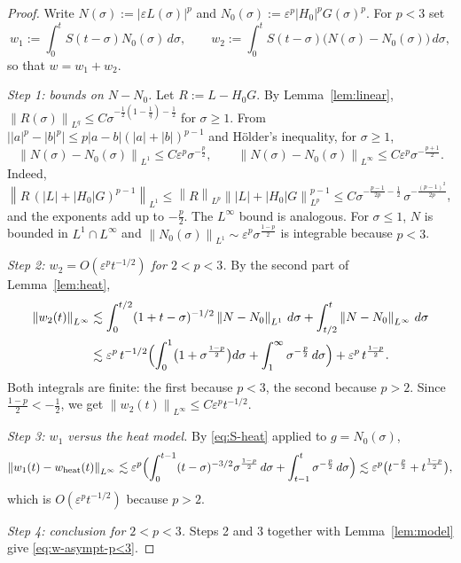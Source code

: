 \documentclass[11pt]{amsart}
\theoremstyle{definition}
\theoremstyle{remark}
\numberwithin{equation}{section}
\newcommand{\ep}{\varepsilon}
\newcommand{\norm}[1]{\left\lVert #1\right\rVert}
\begin{document}
\begin{proof}
Write $N(\sigma):=|\ep L(\sigma)|^p$ and $N_0(\sigma):=\ep^p|H_0|^pG(\sigma)^p$.
For $p<3$ set
\[
w_1:=\int_0^tS(t-\sigma)N_0(\sigma)\,d\sigma,\qquad
w_2:=\int_0^tS(t-\sigma)\bigl(N(\sigma)-N_0(\sigma)\bigr)\,d\sigma ,
\]
so that $w=w_1+w_2$.

\medskip
\noindent\emph{Step 1: bounds on $N-N_0$.}
Let $R:=L-H_0G$. By Lemma~\ref{lem:linear}, $\norm{R(\sigma)}_{L^q}\le
C\sigma^{-\frac12(1-\frac1q)-\frac12}$ for $\sigma\ge1$.
From $\bigl||a|^p-|b|^p\bigr|\le p|a-b|(|a|+|b|)^{p-1}$ and H\"older's
inequality, for $\sigma\ge1$,
\begin{equation}\label{eq:N-diff}
\norm{N(\sigma)-N_0(\sigma)}_{L^1}\le C\ep^p\sigma^{-\frac p2},
\qquad
\norm{N(\sigma)-N_0(\sigma)}_{L^\infty}\le C\ep^p\sigma^{-\frac{p+1}{2}} .
\end{equation}
Indeed,
$\norm{R\,(|L|+|H_0|G)^{p-1}}_{L^1}\le\norm{R}_{L^p}\norm{|L|+|H_0|G}_{L^p}^{p-1}
\le C\sigma^{-\frac{p-1}{2p}-\frac12}\,\sigma^{-\frac{(p-1)^2}{2p}}$,
and the exponents add up to $-\frac p2$. The $L^\infty$ bound is analogous.
For $\sigma\le1$, $N$ is bounded in $L^1\cap L^\infty$ and
$\norm{N_0(\sigma)}_{L^1}\sim\ep^p\sigma^{\frac{1-p}{2}}$ is integrable
because $p<3$.

\medskip
\noindent\emph{Step 2: $w_2=O(\ep^pt^{-1/2})$ for $2<p<3$.}
By the second part of Lemma~\ref{lem:heat},
\begin{align*}
\norm{w_2(t)}_{L^\infty}
&\lesssim \int_0^{t/2}(1+t-\sigma)^{-1/2}\norm{N-N_0}_{L^1}\,d\sigma
+\int_{t/2}^{t}\norm{N-N_0}_{L^\infty}\,d\sigma\\
&\lesssim \ep^p\,t^{-1/2}\Bigl(\int_0^1\bigl(1+\sigma^{\frac{1-p}{2}}\bigr)d\sigma
+\int_1^\infty\sigma^{-\frac p2}\,d\sigma\Bigr)
+\ep^p\,t^{\frac{1-p}{2}} .
\end{align*}
Both integrals are finite: the first because $p<3$, the second because
$p>2$. Since $\frac{1-p}{2}<-\frac12$, we get
$\norm{w_2(t)}_{L^\infty}\le C\ep^pt^{-1/2}$.

\medskip
\noindent\emph{Step 3: $w_1$ versus the heat model.}
By \eqref{eq:S-heat} applied to $g=N_0(\sigma)$,
\[
\norm{w_1(t)-w_{\mathrm{heat}}(t)}_{L^\infty}
\lesssim \ep^p\Bigl(\int_0^{t-1}(t-\sigma)^{-3/2}\sigma^{\frac{1-p}{2}}\,d\sigma
+\int_{t-1}^t\sigma^{-\frac p2}\,d\sigma\Bigr)
\lesssim \ep^p\bigl(t^{-\frac p2}+t^{\frac{1-p}{2}}\bigr),
\]
which is $O(\ep^pt^{-1/2})$ because $p>2$.

\medskip
\noindent\emph{Step 4: conclusion for $2<p<3$.}
Steps 2 and 3 together with Lemma~\ref{lem:model} give \eqref{eq:w-asympt-p<3}.


\end{proof}
\end{document}
